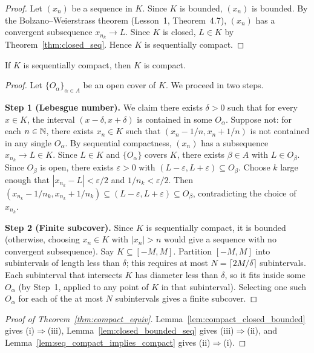 \documentclass[11pt,a4paper]{article}
\begin{document}
\begin{proof}
Let $(x_n)$ be a sequence in $K$. Since $K$ is bounded, $(x_n)$ is
bounded. By the Bolzano--Weierstrass theorem (Lesson~1, Theorem~4.7),
$(x_n)$ has a convergent subsequence $x_{n_k} \to L$. Since $K$ is
closed, $L \in K$ by Theorem~\ref{thm:closed_seq}. Hence $K$ is
sequentially compact.
\end{proof}

\begin{lemma}
\label{lem:seq_compact_implies_compact}
If $K$ is sequentially compact, then $K$ is compact.
\end{lemma}

\begin{proof}
Let $\{O_\alpha\}_{\alpha \in A}$ be an open cover of $K$. We proceed in
two steps.

\textbf{Step 1 (Lebesgue number).} We claim there exists $\delta > 0$
such that for every $x \in K$, the interval $(x - \delta, x + \delta)$ is
contained in some $O_\alpha$. Suppose not: for each $n \in \mathbb{N}$, there
exists $x_n \in K$ such that $(x_n - 1/n, x_n + 1/n)$ is not contained
in any single $O_\alpha$. By sequential compactness, $(x_n)$ has a
subsequence $x_{n_k} \to L \in K$. Since $L \in K$ and
$\{O_\alpha\}$ covers $K$, there exists $\beta \in A$ with
$L \in O_\beta$. Since $O_\beta$ is open, there exists $\varepsilon > 0$
with $(L - \varepsilon, L + \varepsilon) \subseteq O_\beta$. Choose $k$
large enough that $|x_{n_k} - L| < \varepsilon/2$ and $1/n_k <
\varepsilon/2$. Then
$(x_{n_k} - 1/n_k, x_{n_k} + 1/n_k) \subseteq
(L - \varepsilon, L + \varepsilon) \subseteq O_\beta$,
contradicting the choice of $x_{n_k}$.

\textbf{Step 2 (Finite subcover).} Since $K$ is sequentially compact, it
is bounded (otherwise, choosing $x_n \in K$ with $|x_n| > n$ would give
a sequence with no convergent subsequence). Say $K \subseteq [-M, M]$.
Partition $[-M, M]$ into subintervals of length less than $\delta$; this
requires at most $N = \lceil 2M/\delta \rceil$ subintervals. Each
subinterval that intersects $K$ has diameter less than $\delta$, so it
fits inside some $O_\alpha$ (by Step~1, applied to any point of $K$ in
that subinterval). Selecting one such $O_\alpha$ for each of the at most
$N$ subintervals gives a finite subcover.
\end{proof}

\begin{proof}[Proof of Theorem~\ref{thm:compact_equiv}]
Lemma~\ref{lem:compact_closed_bounded} gives (i)$\Rightarrow$(iii),
Lemma~\ref{lem:closed_bounded_seq} gives (iii)$\Rightarrow$(ii), and
Lemma~\ref{lem:seq_compact_implies_compact} gives (ii)$\Rightarrow$(i).
\end{proof}
\end{document}
